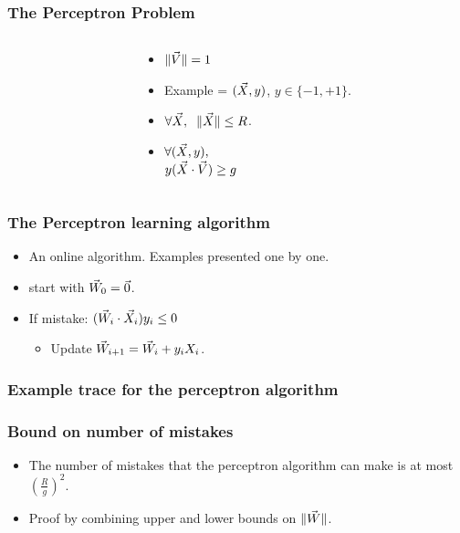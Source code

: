 \documentclass{beamer}
\begin{document}
\begin{frame}
\frametitle{The Perceptron Problem}
\begin{columns}
\begin{column}[T]{5.2cm}
\end{column}

\begin{column}[T]{4cm}
\begin{itemize}
\item
$\| \vec{V} \| =1$
\item 
Example = $(\vec{X},y)$, $y \in \{-1,+1\}$.
\item
$\forall \vec{X},\;\; \| \vec{X} \| \leq R$.
\item
$\forall (\vec{X},y),$\\$y(\vec{X} \cdot \vec{V}) \geq g$
\end{itemize}
\end{column}
\end{columns}

\end{frame}

\begin{frame}
\frametitle{The Perceptron learning algorithm}
\begin{itemize}
\item An online algorithm. Examples presented one by one.
\item start with $\vec{W}_0 = \vec{0}$.
\item If mistake: $(\vec{W}_i \cdot \vec{X}_i) y_i \leq  0$
\begin{itemize}
\item Update $\vec{W}_{i+1} = \vec{W}_i + y_i X_i$.
\end{itemize}
\end{itemize}
\end{frame}

\begin{frame}
\frametitle{Example trace for the perceptron algorithm}
\end{frame}

\begin{frame}
\frametitle{Bound on number of mistakes}
\begin{itemize}
\item The number of mistakes that the perceptron algorithm can make is at most
$\left(\frac{R}{g}\right)^2$.
\item Proof by combining upper and lower bounds on $\| \vec{W} \|$.
\end{itemize}
\end{frame}
\end{document}
